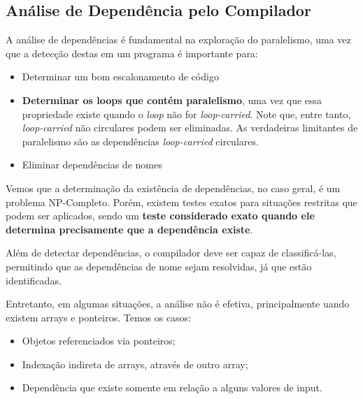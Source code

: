 \subsection{Análise de Dependência pelo Compilador}
A análise de dependências é fundamental na exploração do paralelismo, uma vez que a detecção destas em um programa é importante para:
\begin{itemize}
  \item Determinar um bom escalonamento de código

  \item \textbf{Determinar os loops que contém paralelismo}, uma vez que essa propriedade existe quando o \textit{loop} não for \textit{loop-carried}. Note que, entre tanto, \textit{loop-carried} não circulares podem ser eliminadas. As verdadeiras limitantes de paralelismo são as dependências \textit{loop-carried} circulares.

  \item Eliminar dependências de nomes
\end{itemize}

Vemos que a determinação da existência de dependências, no caso geral, é um problema NP-Completo. Porém, existem testes exatos para situações restritas que podem ser aplicados, sendo um \textbf{teste considerado exato quando ele determina precisamente que a dependência existe}.

Além de detectar dependências, o compilador deve ser capaz de classificá-las, permitindo que as dependências de nome sejam resolvidas, já que estão identificadas.

Entretanto, em algumas situações, a análise não é efetiva, principalmente uando existem arrays e ponteiros. Temos os casos:
\begin{itemize}
  \item Objetos referenciados via ponteiros;
  \item Indexação indireta de arrays, através de outro array;
  \item Dependência que existe somente em relação a alguns valores de input.
\end{itemize}
